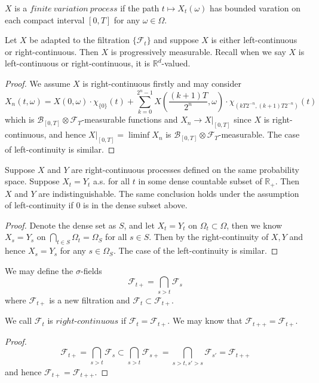 \documentclass[lang=en, color=blue, ]{elegantbook}
\newcommand{\F}{\mathcal{F}}
\newcommand{\R}{\mathbb{R}}
\newcommand{\B}{\mathcal{B}}
\begin{document}
\begin{definition}
    $X$ is a $finite\ variation\ process$ if the path $t\mapsto X_t(\omega)$ has bounded varation on each compact interval $[0,T]$ for any $\omega\in\Omega$.
\end{definition}

\begin{lemma}
    Let $X$ be adapted to the filtration $\{\F_t\}$ and suppose $X$ is either left-continuous or right-continuous. Then $X$ is progressively measurable. Recall when we say $X$ is left-continuous or right-continuous, it is $\R^d$-valued.
\end{lemma}
\begin{proof}\par
    We assume $X$ is right-continuous firstly and may consider
    \[X_n(t,\omega) = X(0,\omega)\cdot \chi_{\{0\}}(t)  + \sum\limits_{k=0}^{2^n-1}X(\dfrac{(k+1)T}{2^n},\omega)\cdot\chi_{(kT2^{-n},(k+1)T2^{-n})}(t)\]
    which is $\B_{[0,T]}\otimes \F_{T}$-measurable functions and $X_n\to X|_{[0,T]}$ since $X$ is right-continuous, and hence $X|_{[0,T]} = \liminf X_n$ is $\B_{[0,T]}\otimes \F_T$-measurable. The case of left-continuity is similar.
\end{proof}

\begin{lemma}
Suppose $X$ and $Y$ are right-continuous processes defined on the same probability space. Suppose $X_t = Y_t$ a.s. for all $t$ in some dense countable subset of $\R_+$. Then $X$ and $Y$ are indistinguishable. The same conclusion holds under the assumption of left-continuity if $0$ is in the dense subset above.
\end{lemma}
\begin{proof}\par
Denote the dense set as $S$, and let $X_t = Y_t$ on $\Omega_t\subset\Omega$, then we know $X_s = Y_s$ on $\bigcap_{t\in S} \Omega_t = \Omega_S$ for all $s\in S$. Then by the right-continuity of $X,Y$ and hence $X_s = Y_s$ for any $s\in \Omega_S$. The case of the left-continuity is similar.
\end{proof}

\begin{definition}
    We may define the $\sigma$-fields
    \[\F_{t+} = \bigcap_{s>t} \F_s\]
    where $\F_{t+}$ is a new filtration and $\F_t \subset \F_{t+}$.\par
    We call $\F_t$ is $right$-$continuous$ if $\F_t = \F_{t+}$. We may know that $\F_{t++} = \F_{t+}$.
\end{definition}
\begin{proof}\par
    \[\F_{t+} = \bigcap_{s>t}\F_{s} \subset \bigcap_{s>t}\F_{s+} = \bigcap_{s>t,s'>s}\F_{s'} = \F_{t++}\]
    and hence $\F_{t+} = \F_{t++}$.
\end{proof}
\end{document}
